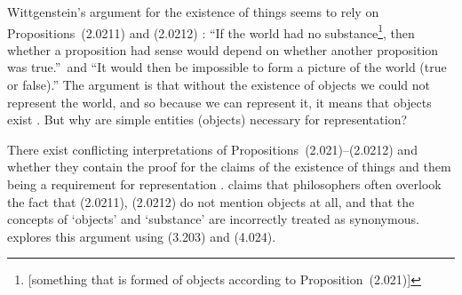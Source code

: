 \documentclass{article}
\newcommand{\prop}[1]{(#1)}
\begin{document}
Wittgenstein's argument for the existence of things seems to rely on Propositions~\prop{2.0211} and \prop{2.0212} \cite{Sp2007}: ``If the world had no substance\footnote{[something that is formed of objects according to Proposition~\prop{2.021}]}, then whether a proposition had sense would depend on whether another proposition was true.''\ and ``It would then be impossible to form a picture of the world (true or false).''
The argument is that without the existence of objects we could not represent the world, and so because we can represent it, it means that objects exist \cite{Sp2007}.
But why are simple entities (objects) necessary for representation?

There exist conflicting interpretations of Propositions~\prop{2.021}--\prop{2.0212} and whether they contain the proof for the claims of the existence of things and them being a requirement for representation \cite{Lu1976, Gr1964, We1935, An1959, Pi1964}. 
\cite{Lu1976} claims that philosophers often overlook the fact that \prop{2.0211}, \prop{2.0212} do not mention objects at all, and that the concepts of `objects' and `substance' are incorrectly treated as synonymous.
\cite{Sp2007} explores this argument using \prop{3.203} and \prop{4.024}.

\printbibliography[title=References]
\end{document}
